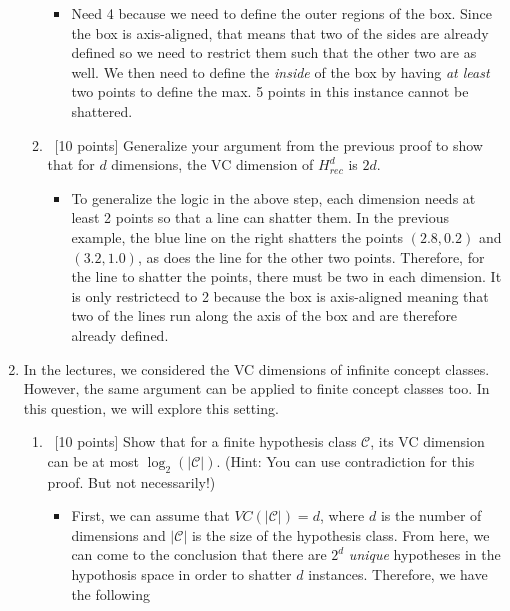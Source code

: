\begin{enumerate}
\begin{enumerate}
\begin{itemize}
\item Need 4 because we need to define the outer regions of the box. Since the box is axis-aligned, that means that two of the sides are already defined so we need to restrict them such that the other two are as well. We then need to define the {\em inside} of the box by having {\em at least} two points to define the max. 5 points in this instance cannot be shattered. 
\end{itemize}


  \item ~[10 points] Generalize your argument from the previous proof
    to show that for $d$ dimensions, the VC dimension of $H^d_{rec}$
    is $2d$.
\begin{itemize}
\item To generalize the logic in the above step, each dimension needs at least 2 points so that a line can shatter them. In the previous example, the blue line on the right shatters the points $(2.8,0.2)$ and $(3.2,1.0)$, as does the line for the other two points. Therefore, for the line to shatter the points, there must be two in each dimension. It is only restrictecd to 2 because the box is axis-aligned meaning that two of the lines run along the axis of the box and are therefore already defined.
\end{itemize}
  \end{enumerate}
  
\item In the lectures, we considered the VC dimensions of infinite
  concept classes. However, the same argument can be applied to finite
  concept classes too. In this question, we will explore this setting.

  \begin{enumerate}
  \item ~[10 points] Show that for a finite hypothesis class
    $\mathcal{C}$, its VC dimension can be at most
    $\log_2\left(|\mathcal{C}|\right)$. (Hint: You can use
    contradiction for this proof. But not necessarily!)

\begin{itemize}
\item First, we can assume that $VC(\left|\mathcal{C}\right|)=d$, where $d$ is the number of dimensions and $\left|\mathcal{C} \right|$ is the size of the hypothesis class. From here, we can come to the conclusion that there are $2^{d}$ {\em unique} hypotheses in the hypothosis space in order to shatter $d$ instances. Therefore, we have the following


\end{itemize}
\end{enumerate}
\end{enumerate}
